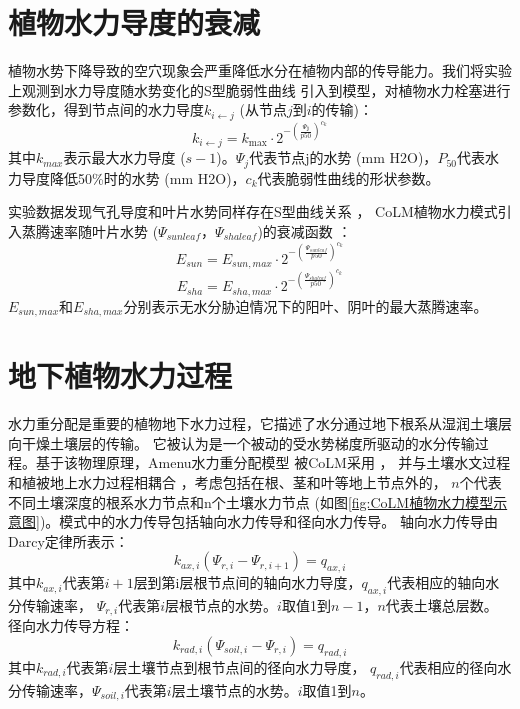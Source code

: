 \section{植物水力导度的衰减}\label{植物水力导度的衰减}
植物水势下降导致的空穴现象会严重降低水分在植物内部的传导能力。我们将实验上观测到水力导度随水势变化的S型脆弱性曲线 
\citep{sperry1988method,gentine2016allometry,neufeld1992genotypic,pammenter1998mathematical,plaut2012hydraulic}
 引入到模型，对植物水力栓塞进行参数化，得到节点间的水力导度$k_{i\gets j}$ (从节点$j$到$i$的传输)：
 \begin{equation}
k_{i \leftarrow j}=k_{\max } \cdot 2^{-\left(\frac{\Psi_{\mathbf{j}}}{p 50}\right)^{c_{k}}}
\end{equation}
其中$k_{max}$表示最大水力导度 ($s-1$)。$\Psi_j$代表节点j的水势 (mm H2O)，$P_{50}$代表水力导度降低50\%时的水势 (mm H2O)，$c_k$代表脆弱性曲线的形状参数。



实验数据发现气孔导度和叶片水势同样存在S型曲线关系 \citep{klein2014variability}，
CoLM植物水力模式引入蒸腾速率随叶片水势 ($\Psi_{sunleaf}$，$\Psi_{shaleaf}$)的衰减函数 \citep{kennedy2019implementing}：
\begin{equation}\label{e_sun_a}
E_{ {sun }}=E_{ {sun,max }} \cdot 2^{-\left(\frac{\Psi_{ {sunleaf }}}{p 50}\right)^{c_{k}}}
\end{equation}
\begin{equation}\label{e_sha_a}
E_{ {sha }}=E_{ {sha,max }} \cdot 2^{-\left(\frac{\Psi_{ {shaleaf }}}{p 50}\right)^{c_{k}}}
\end{equation}
$E_{sun,max} $和$E_{sha,max}$分别表示无水分胁迫情况下的阳叶、阴叶的最大蒸腾速率。

\section{地下植物水力过程}\label{地下植物水力过程}
水力重分配是重要的植物地下水力过程，它描述了水分通过地下根系从湿润土壤层向干燥土壤层的传输。
它被认为是一个被动的受水势梯度所驱动的水分传输过程。基于该物理原理，Amenu水力重分配模型 \citep{amenu2008}被CoLM采用 \citep{zhu2017incorporating}，
并与土壤水文过程和植被地上水力过程相耦合 \citep{li2021new}，考虑包括在根、茎和叶等地上节点外的， 
$n$个代表不同土壤深度的根系水力节点和n个土壤水力节点 (如图\ref{fig:CoLM植物水力模型示意图})。模式中的水力传导包括轴向水力传导和径向水力传导。
轴向水力传导由Darcy定律所表示：
\begin{equation}\label{k_axi}
k_{ax,i}\left(\Psi_{r,i}-\Psi_{r,i+1}\right)=q_{ax,i}
\end{equation}
其中$k_{ax,i}$代表第$i+1$层到第i层根节点间的轴向水力导度，$q_{ax,i}$代表相应的轴向水分传输速率，
$\Psi_{r,i}$代表第$i$层根节点的水势。$i$取值1到$n-1$，$n$代表土壤总层数。\\
径向水力传导方程：
\begin{equation}\label{k_radi}
k_{rad,i}\left(\Psi_{soil,i}-\Psi_{r,i}\right)=q_{rad,i}
\end{equation}
其中$k_{rad,i}$代表第$i$层土壤节点到根节点间的径向水力导度，
$q_{rad,i}$代表相应的径向水分传输速率，$\Psi_{soil,i}$代表第$i$层土壤节点的水势。$i$取值1到$n$。



